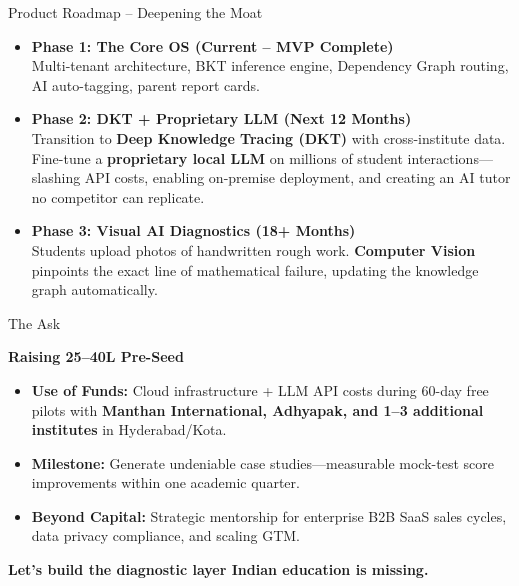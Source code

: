 \documentclass[aspectratio=169, 10pt]{beamer}
\begin{document}
\begin{frame}{Product Roadmap -- Deepening the Moat}
  \begin{itemize}
    \setlength\itemsep{0.7em}
    \item \textbf{\textcolor{LearnGreen}{Phase 1: The Core OS} \small(Current -- MVP Complete)}\\
    Multi-tenant architecture, BKT inference engine, Dependency Graph routing, AI auto-tagging, parent report cards.

    \item \textbf{\textcolor{LearnBlue}{Phase 2: DKT + Proprietary LLM} \small(Next 12 Months)}\\
    Transition to \textbf{Deep Knowledge Tracing (DKT)} with cross-institute data. Fine-tune a \textbf{proprietary local LLM} on millions of student interactions---slashing API costs, enabling on-premise deployment, and creating an AI tutor no competitor can replicate.

    \item \textbf{\textcolor{LearnAccent}{Phase 3: Visual AI Diagnostics} \small(18+ Months)}\\
    Students upload photos of handwritten rough work. \textbf{Computer Vision} pinpoints the exact line of mathematical failure, updating the knowledge graph automatically.
  \end{itemize}
\end{frame}

\begin{frame}{The Ask}
  \centering
  \vspace{0.5em}

  {\Large\textbf{Raising 25--40L Pre-Seed}}

  \vspace{1em}

  \begin{itemize}
    \setlength\itemsep{0.6em}
    \item \textbf{Use of Funds:} Cloud infrastructure + LLM API costs during 60-day free pilots with \textbf{Manthan International, Adhyapak, and 1--3 additional institutes} in Hyderabad/Kota.

    \item \textbf{Milestone:} Generate undeniable case studies---measurable mock-test score improvements within one academic quarter.

    \item \textbf{Beyond Capital:} Strategic mentorship for enterprise B2B SaaS sales cycles, data privacy compliance, and scaling GTM.
  \end{itemize}

  \vspace{1.2em}
  {\Large\textcolor{LearnBlue}{\textbf{Let's build the diagnostic layer Indian education is missing.}}}
\end{frame}
\end{document}
